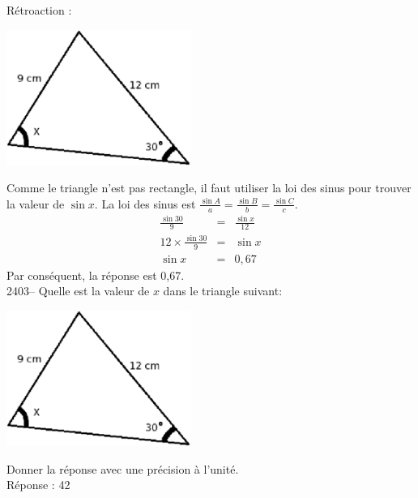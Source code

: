 \documentclass[letterpaper, 12pt]{article}
\begin{document}
R\'etroaction :\\
\begin{center}
 \includegraphics[width=6cm,bb=14 14 688 582]{Q2402.eps}
\end{center}
Comme le triangle n'est pas rectangle, il faut utiliser la loi des sinus pour trouver la valeur de $\sin{x}$. La loi des sinus est $\frac{\sin{A}}{a}=\frac{\sin{B}}{b}=\frac{\sin{C}}{c}$.
\begin{eqnarray*}
 \frac{\sin{30}}{9}&=&\frac{\sin{x}}{12}\\[2mm]
 12 \times \frac{\sin{30}}{9}&=&\sin{x}\\[2mm]
 \sin{x} &=& 0,67
\end{eqnarray*}
Par cons\'equent, la r\'eponse est 0,67.\\

2403-- Quelle est la valeur de $x$ dans le triangle suivant:
\begin{center}
 \includegraphics[width=6cm,bb=14 14 688 582]{Q2402.eps}
\end{center}
Donner la r\'eponse avec une pr\'ecision \`a l'unit\'e.\\

R\'eponse : 42\\
\end{document}
